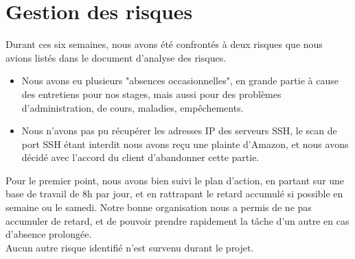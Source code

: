 \section{Gestion des risques}

Durant ces six semaines, nous avons été confrontés à deux risques que nous avions listés dans le document d'analyse des risques.
\begin{itemize}
\item Nous avons eu plusieurs "absences occasionnelles", en grande partie à cause des entretiens pour nos stages, mais aussi pour des problèmes d'administration, de cours, maladies, empêchements.
\item Nous n'avons pas pu récupérer les adresses IP des serveurs SSH, le scan de port SSH étant interdit nous avons reçu une plainte d'Amazon, et nous avons décidé avec l'accord du client d'abandonner cette partie.\\
\end{itemize}

Pour le premier point, nous avons bien suivi le plan d'action, en partant sur une base de travail de 8h par jour, et en rattrapant le retard accumulé si possible en semaine ou le samedi. Notre bonne organisation nous a permis de ne pas accumuler de retard, et de pouvoir prendre rapidement la tâche d'un autre en cas d'absence prolongée.\\

Aucun autre risque identifié n'est survenu durant le projet.
